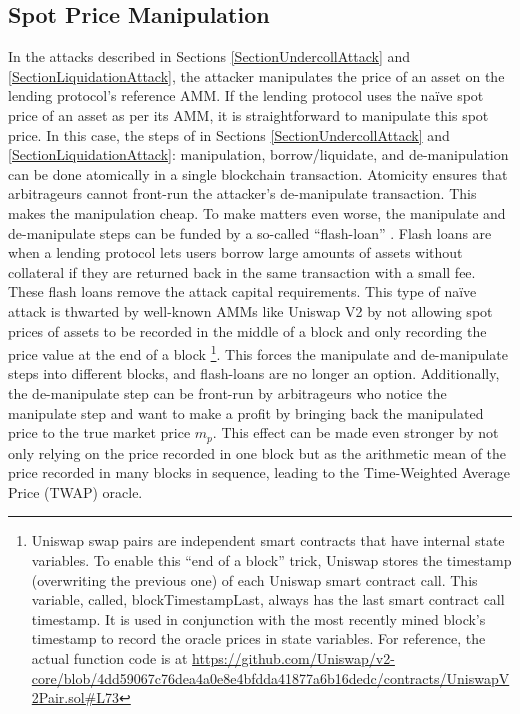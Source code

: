\subsection{Spot Price Manipulation}
In the attacks described in Sections \ref{SectionUndercollAttack} and \ref{SectionLiquidationAttack}, the attacker manipulates the price of an asset on the lending protocol's reference AMM. If the lending protocol uses the na\"ive spot price of an asset as per its AMM, it is straightforward to manipulate this spot price. In this case, the steps of in Sections \ref{SectionUndercollAttack} and \ref{SectionLiquidationAttack}: manipulation, borrow/liquidate, and de-manipulation can be done atomically in a single blockchain transaction. Atomicity ensures that arbitrageurs cannot front-run the attacker's de-manipulate transaction. This makes the manipulation cheap. To make matters even worse, the manipulate and de-manipulate steps can be funded by a so-called ``flash-loan'' \cite{qin2021attacking}. Flash loans are when a lending protocol lets users borrow large amounts of assets without collateral if they are returned back in the same transaction with a small fee. These flash loans remove the attack capital requirements. This type of na\"ive attack is thwarted by well-known AMMs like Uniswap V2 \cite{Adams2020UniV2} by not allowing spot prices of assets to be recorded in the middle of a block and only recording the price value at the end of a block \footnote{Uniswap swap pairs are independent smart contracts that have internal state variables. To enable this ``end of a block'' trick, Uniswap stores the timestamp (overwriting the previous one) of each Uniswap smart contract call. This variable, called, blockTimestampLast, always has the last smart contract call timestamp. It is used in conjunction with the most recently mined block's timestamp to record the oracle prices in state variables. For reference, the actual function code is at \url{https://github.com/Uniswap/v2-core/blob/4dd59067c76dea4a0e8e4bfdda41877a6b16dedc/contracts/UniswapV2Pair.sol\#L73}}. This forces the manipulate and de-manipulate steps into different blocks, and flash-loans are no longer an option. Additionally, the de-manipulate step can be front-run by arbitrageurs who notice the manipulate step and want to make a profit by bringing back the manipulated price to the true market price $m_p$. This effect can be made even stronger by not only relying on the price recorded in one block but as the arithmetic mean of the price recorded in many blocks in sequence, leading to the Time-Weighted Average Price (TWAP) oracle.

